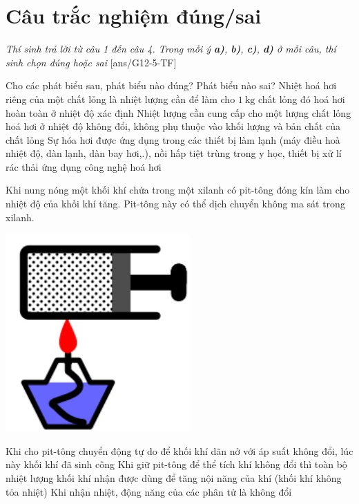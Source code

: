 \section{Câu trắc nghiệm đúng/sai} 
\textit{Thí sinh trả lời từ câu 1 đến câu 4. Trong mỗi ý \textbf{a)}, \textbf{b)}, \textbf{c)}, \textbf{d)} ở mỗi câu, thí sinh chọn đúng hoặc sai}
\setcounter{ex}{0}
[ans/G12-5-TF]
\begin{ex}
Cho các phát biểu sau, phát biểu nào đúng? Phát biểu nào sai?	
	{\True Nhiệt hoá hơi riêng của một chất lỏng là nhiệt lượng cần để làm cho $\SI{1}{\kilogram}$ chất lỏng đó hoá hơi hoàn toàn ở nhiệt độ xác định}
	{Nhiệt lượng cần cung cấp cho một lượng chất lỏng hoá hơi ở nhiệt độ không đổi, không phụ thuộc vào khối lượng và bản chất của chất lỏng}
	{\True Sự hóa hơi được ứng dụng trong các thiết bị làm lạnh (máy điều hoà nhiệt độ, dàn lạnh, dàn bay hơi,.), nồi hấp tiệt trùng trong y học, thiết bị xử lí rác thải ứng dụng công nghệ hoá hơi}
	\loigiai{}
\end{ex}
\begin{ex}
	Khi nung nóng một khối khí chứa trong một xilanh có pit-tông đóng kín làm cho nhiệt độ của khối khí tăng. Pit-tông này có thể dịch chuyển không ma sát trong xilanh.
	\begin{center}
		\includegraphics[width=0.15\linewidth]{../figs/D12-5-2}
	\end{center}
	{\True Khi cho pit-tông chuyển động tự do để khối khí dãn nở với áp suất không đổi, lúc này khối khí đã sinh công}
	{\True Khi giữ pit-tông để thể tích khí không đổi thì toàn bộ nhiệt lượng khối khí nhận được dùng để tăng nội năng của khí (khối khí không tỏa nhiệt)}
	{Khi nhận nhiệt, động năng của các phân tử là không đổi}
	\loigiai{}
\end{ex}
